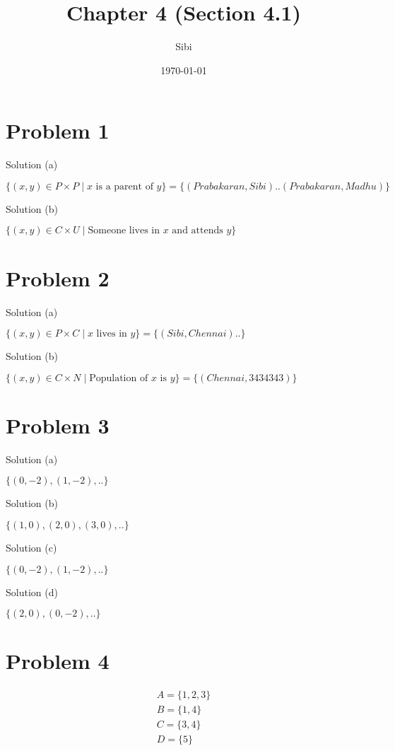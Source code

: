 \documentclass{article}
\begin{document}
\title{Chapter 4 (Section 4.1)}
\author{Sibi}
\date{\today}
\maketitle
\newpage

\section{Problem 1}

Solution (a)

$\{(x,y) \in P \times P \mid x \text{ is a parent of } y \} = \{(Prabakaran, Sibi) ..
(Prabakaran, Madhu)\}$ 

Solution (b)

$\{(x,y) \in C \times U \mid \text{Someone lives in } x \text{ and
    attends } y \}$

\section{Problem 2}

Solution (a)

$\{(x,y) \in P \times C \mid x \text{ lives in } y \} = \{(Sibi, Chennai) .. \}$

Solution (b)

$\{(x,y) \in C \times N \mid \text{Population of } x \text{ is } y \} = \{(Chennai, 3434343)\}$

\section{Problem 3}

Solution (a)

$\{(0,-2), (1,-2), ..\}$

Solution (b)

$\{(1,0), (2,0), (3,0), ..\}$

Solution (c)

$\{(0,-2), (1,-2), ..\}$

Solution (d)

$\{(2,0), (0, -2), ..\}$

\section{Problem 4}

\begin{align*}
A = \{1,2,3\} \\
B = \{1,4\} \\
C = \{3,4\} \\
D = \{5\} 
\end{align*}
\end{document}
